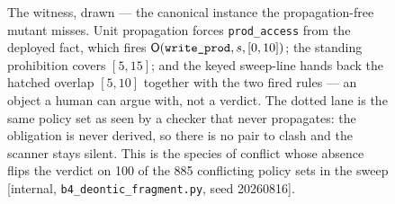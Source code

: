 \begin{figure}[t]
\caption{The witness, drawn --- the canonical instance the propagation-free mutant misses. Unit propagation forces
\texttt{prod\_access} from the deployed fact, which fires $\mathsf{O}(\texttt{write\_prod},s,[0,10])$; the standing prohibition covers
$[5,15]$; and the keyed sweep-line hands back the hatched overlap $[5,10]$ together with the two fired rules --- an object a
human can argue with, not a verdict. The dotted lane is the same policy set as seen by a checker that never propagates: the
obligation is never derived, so there is no pair to clash and the scanner stays silent. This is the species of conflict whose
absence flips the verdict on 100 of the 885 conflicting policy sets in the sweep [internal, \texttt{b4\_deontic\_fragment.py},
seed 20260816].}
\label{fig:witness}
\end{figure}
